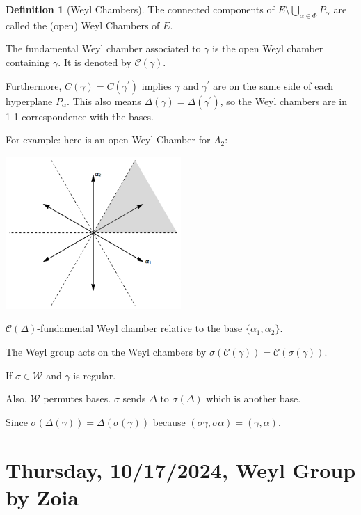 \documentclass{article}
\theoremstyle{definition}
\newtheorem*{definition}{Definition}
\begin{document}
\begin{definition}
    [Weyl Chambers]
    The connected components of \(E \setminus \bigcup_{\alpha \in \Phi}^{} P_\alpha\) are called the (open) Weyl Chambers of \(E\).
    
    The fundamental Weyl chamber associated to \(\gamma\) is the open Weyl chamber containing \(\gamma\). It is denoted by \(\mathcal{C}(\gamma)\).
    
    Furthermore, \(C(\gamma) = C(\gamma ^{\prime})\) implies \(\gamma\) and \(\gamma ^{\prime} \) are on the same side of each hyperplane \(P_\alpha\). This also means \(\Delta (\gamma) = \Delta (\gamma ^{\prime} )\), so the Weyl chambers are in 1-1 correspondence with the bases.
\end{definition}

For example: here is an open Weyl Chamber for \(A_2\):

\begin{center}
    \includegraphics[width=0.5\textwidth]{img/Weyl_chambers_for_A2}

    \(\mathcal{C}(\Delta)\)-fundamental Weyl chamber relative to the base \(\{ \alpha_1, \alpha_2 \}\). 
\end{center}

The Weyl group acts on the Weyl chambers by \(\sigma (\mathcal{C}(\gamma)) = \mathcal{C}(\sigma(\gamma))\). 

If \(\sigma \in \mathcal{W}\) and \(\gamma\) is regular.

Also, \(\mathcal{W}\) permutes bases. \(\sigma\) sends \(\Delta\) to \(\sigma(\Delta)\) which is another base.

Since \(\sigma(\Delta (\gamma)) = \Delta (\sigma (\gamma))\) because \((\sigma \gamma , \sigma \alpha ) = (\gamma , \alpha)\).

\section{Thursday, 10/17/2024, Weyl Group by Zoia}
\end{document}
